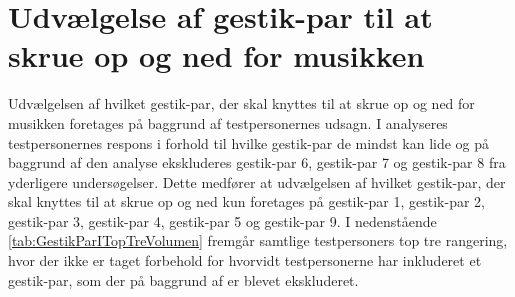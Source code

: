 \section{Udvælgelse af gestik-par til at skrue op og ned for musikken}
\label{TestresultaterVolumen}
%
Udvælgelsen af hvilket gestik-par, der skal knyttes til at skrue op og ned for musikken foretages på baggrund af testpersonernes udsagn. I  analyseres testpersonernes respons i forhold til hvilke gestik-par de mindst kan lide og på baggrund af den analyse ekskluderes gestik-par 6, gestik-par 7 og gestik-par 8 fra yderligere undersøgelser. Dette medfører at udvælgelsen af hvilket gestik-par, der skal knyttes til at skrue op og ned kun foretages på gestik-par 1, gestik-par 2, gestik-par 3, gestik-par 4, gestik-par 5 og gestik-par 9.\blankline
%  
I nedenstående \autoref{tab:GestikParITopTreVolumen} fremgår samtlige testpersoners top tre rangering, hvor der ikke er taget forbehold for hvorvidt testpersonerne har inkluderet et gestik-par, som der på baggrund af  er blevet ekskluderet.
%
